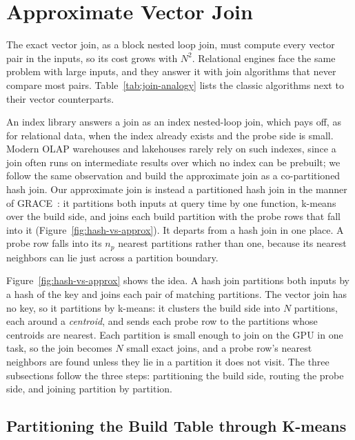 \section{Approximate Vector Join}\label{sec:technical-2:-approximate}\label{sec:approx-join}

The exact vector join, as a block nested loop join, must compute every vector pair in the inputs, so its cost grows with $N^2$.
Relational engines face the same problem with large inputs, and they answer it with join algorithms that never compare most pairs.
Table~\ref{tab:join-analogy} lists the classic algorithms next to their vector counterparts.

An index library answers a join as an index nested-loop join, which pays off, as for relational data, when the index already exists and the probe side is small.
Modern OLAP warehouses and lakehouses rarely rely on such indexes, since a join often runs on intermediate results over which no index can be prebuilt; we follow the same observation and build the approximate join as a co-partitioned hash join.
Our approximate join is instead a partitioned hash join in the manner of GRACE~\cite{KitsuregawaGrace83}: it partitions both inputs at query time by one function, k-means over the build side, and joins each build partition with the probe rows that fall into it (Figure~\ref{fig:hash-vs-approx}).
It departs from a hash join in one place.
A probe row falls into its $n_p$ nearest partitions rather than one, because its nearest neighbors can lie just across a partition boundary.



Figure~\ref{fig:hash-vs-approx} shows the idea.
A hash join partitions both inputs by a hash of the key and joins each pair of matching partitions.
The vector join has no key, so it partitions by k-means: it clusters the build side into $N$ partitions, each around a \emph{centroid}, and sends each probe row to the partitions whose centroids are nearest.
Each partition is small enough to join on the GPU in one task, so the join becomes $N$ small exact joins, and a probe row's nearest neighbors are found unless they lie in a partition it does not visit.
The three subsections follow the three steps: partitioning the build side, routing the probe side, and joining partition by partition.

\subsection{Partitioning the Build Table through K-means}\label{subsec:approx-build}


